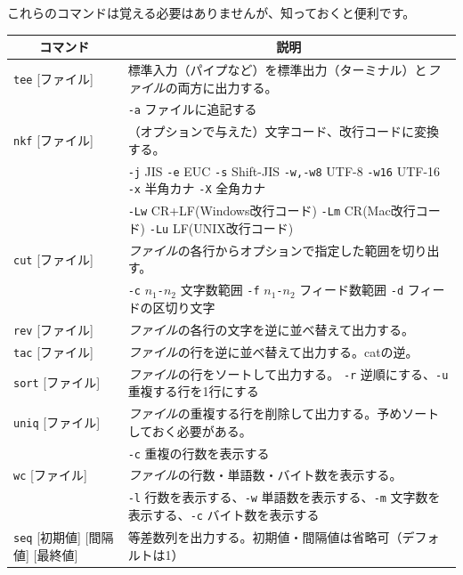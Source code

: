 \documentclass[a4j]{ltjreport}
\begin{document}
    これらのコマンドは覚える必要はありませんが、知っておくと便利です。
    \begin{longtable}[c]{|p{3.5cm}|p{13.5cm}|}
        \hline
        \multicolumn{1}{|c|}{\textbf{コマンド}}&\multicolumn{1}{|c|}{\textbf{説明}}\\
        \hline\hline
        \texttt{tee} [ファイル] &標準入力（パイプなど）を標準出力（ターミナル）と\emph{ファイル}の両方に出力する。\\
        & \texttt{-a} ファイルに追記する\\
        \hline
        \texttt{nkf} [ファイル] &（オプションで与えた）文字コード、改行コードに変換する。\\
        &\texttt{-j} JIS \texttt{-e} EUC \texttt{-s} Shift-JIS \texttt{-w,-w8} UTF-8 \texttt{-w16} UTF-16 \texttt{-x} 半角カナ \texttt{-X} 全角カナ\\
        &\texttt{-Lw} CR+LF(Windows改行コード) \texttt{-Lm} CR(Mac改行コード) \texttt{-Lu} LF(UNIX改行コード)\\
        \hline
        \texttt{cut} [ファイル]&\emph{ファイル}の各行からオプションで指定した範囲を切り出す。\\
        &\texttt{-c} \textit{$n_1$\texttt{-}$n_2$} 文字数範囲 \texttt{-f} \textit{$n_1$\texttt{-}$n_2$} フィード数範囲 \texttt{-d} フィードの区切り文字 \\
        \hline
        \texttt{rev} [ファイル]&\emph{ファイル}の各行の文字を逆に並べ替えて出力する。\\
        \hline
        \texttt{tac} [ファイル]&\emph{ファイル}の行を逆に並べ替えて出力する。catの逆。\\
        \hline
        \texttt{sort} [ファイル]&\emph{ファイル}の行をソートして出力する。 \texttt{-r} 逆順にする、\texttt{-u} 重複する行を1行にする\\ 
        \hline
        \texttt{uniq} [ファイル]&\emph{ファイル}の重複する行を削除して出力する。予めソートしておく必要がある。\\
        &\texttt{-c} 重複の行数を表示する\\
        \hline
        \texttt{wc} [ファイル]&\emph{ファイル}の行数・単語数・バイト数を表示する。\\
        &\texttt{-l} 行数を表示する、\texttt{-w} 単語数を表示する、\texttt{-m} 文字数を表示する、\texttt{-c} バイト数を表示する\\
        \hline
        \texttt{seq} [初期値] [間隔値] [最終値] &等差数列を出力する。初期値・間隔値は省略可（デフォルトは1）\\

\end{longtable}
\end{document}
